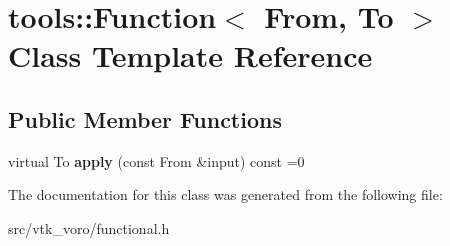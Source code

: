 \hypertarget{classtools_1_1Function}{}\section{tools\+:\+:Function$<$ From, To $>$ Class Template Reference}
\label{classtools_1_1Function}
\subsection*{Public Member Functions}
\begin{DoxyCompactItemize}
\item 
virtual To {\bfseries apply} (const From \&input) const =0\hypertarget{classtools_1_1Function_a524643d3b635f941ee5b1b3423cc35b2}{}\label{classtools_1_1Function_a524643d3b635f941ee5b1b3423cc35b2}

\end{DoxyCompactItemize}


The documentation for this class was generated from the following file\+:\begin{DoxyCompactItemize}
\item 
src/vtk\+\_\+voro/functional.\+h\end{DoxyCompactItemize}
